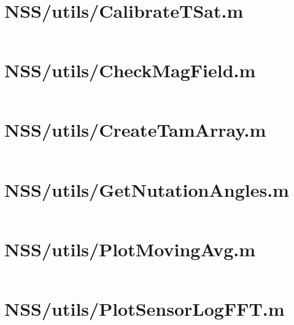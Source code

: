 \pagebreak
\section*{NSS/utils/CalibrateTSat.m}\label{code:NSS/utils/CalibrateTSat.m}
\inputminted[linenos,fontsize=\scriptsize]{matlab}{/home/dcouture/git/mathyourlife/TSatPy/beta_versions/matlab_object_oriented/utils/CalibrateTSat.m}

\pagebreak
\section*{NSS/utils/CheckMagField.m}\label{code:NSS/utils/CheckMagField.m}
\inputminted[linenos,fontsize=\scriptsize]{matlab}{/home/dcouture/git/mathyourlife/TSatPy/beta_versions/matlab_object_oriented/utils/CheckMagField.m}

\pagebreak
\section*{NSS/utils/CreateTamArray.m}\label{code:NSS/utils/CreateTamArray.m}
\inputminted[linenos,fontsize=\scriptsize]{matlab}{/home/dcouture/git/mathyourlife/TSatPy/beta_versions/matlab_object_oriented/utils/CreateTamArray.m}

\pagebreak
\section*{NSS/utils/GetNutationAngles.m}\label{code:NSS/utils/GetNutationAngles.m}
\inputminted[linenos,fontsize=\scriptsize]{matlab}{/home/dcouture/git/mathyourlife/TSatPy/beta_versions/matlab_object_oriented/utils/GetNutationAngles.m}

\pagebreak
\section*{NSS/utils/PlotMovingAvg.m}\label{code:NSS/utils/PlotMovingAvg.m}
\inputminted[linenos,fontsize=\scriptsize]{matlab}{/home/dcouture/git/mathyourlife/TSatPy/beta_versions/matlab_object_oriented/utils/PlotMovingAvg.m}

\pagebreak
\section*{NSS/utils/PlotSensorLogFFT.m}\label{code:NSS/utils/PlotSensorLogFFT.m}
\inputminted[linenos,fontsize=\scriptsize]{matlab}{/home/dcouture/git/mathyourlife/TSatPy/beta_versions/matlab_object_oriented/utils/PlotSensorLogFFT.m}

